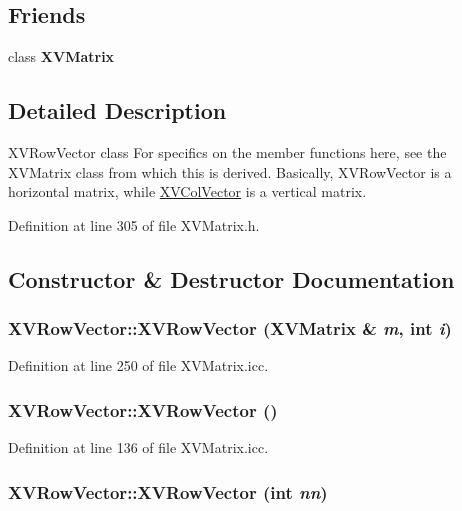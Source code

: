 \subsection*{Friends}
\begin{CompactItemize}
\item 
class {\bf XVMatrix}
\end{CompactItemize}


\subsection{Detailed Description}
XVRow\-Vector class For specifics on the member functions here, see the XVMatrix class from which this is derived. Basically, XVRow\-Vector is a horizontal matrix, while \hyperlink{class_XVColVector}{XVCol\-Vector} is a vertical matrix.





Definition at line 305 of file XVMatrix.h.

\subsection{Constructor \& Destructor Documentation}
\label{XVRowVector_b0}
\hypertarget{class_XVRowVector_b0}{
\subsubsection[XVRowVector]{\setlength{\rightskip}{0pt plus 5cm}XVRow\-Vector::XVRow\-Vector (XVMatrix \& {\em m}, int {\em i})}}




Definition at line 250 of file XVMatrix.icc.\label{XVRowVector_a0}
\hypertarget{class_XVRowVector_a0}{
\subsubsection[XVRowVector]{\setlength{\rightskip}{0pt plus 5cm}XVRow\-Vector::XVRow\-Vector ()}}




Definition at line 136 of file XVMatrix.icc.\label{XVRowVector_a1}
\hypertarget{class_XVRowVector_a1}{
\subsubsection[XVRowVector]{\setlength{\rightskip}{0pt plus 5cm}XVRow\-Vector::XVRow\-Vector (int {\em nn})}}




